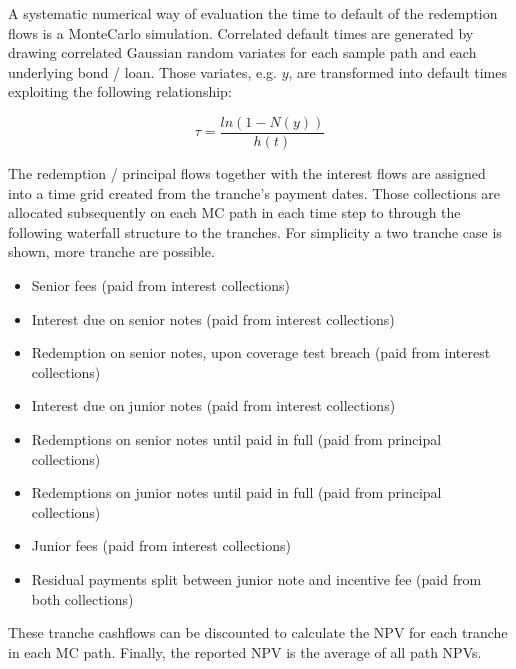 A systematic numerical way of evaluation the time to default of the redemption flows is a MonteCarlo simulation. 
Correlated default times are generated by drawing correlated Gaussian random variates for each sample path and each underlying bond / loan. 
Those variates, e.g. $y$, are transformed into default times exploiting the following relationship: 

$$
\tau = \frac{ ln \left( 1- N \left( y \right) \right) } { h \left( t \right) } 
$$

The redemption / principal flows together with the interest flows are assigned into a time grid created from the tranche’s payment dates. 
Those collections are allocated subsequently on each MC path in each time step to through the following waterfall structure to the tranches.
For simplicity a two tranche case is shown, more tranche are possible. 

\begin{itemize}
	\item Senior fees (paid from interest collections)
	\item Interest due on senior notes (paid from interest collections)
	\item Redemption on senior notes, upon coverage test breach (paid from interest collections)
	\item Interest due on junior notes (paid from interest collections)
	\item Redemptions on senior notes until paid in full (paid from principal collections)
	\item Redemptions on junior notes until paid in full (paid from principal collections)
	\item Junior fees (paid from interest collections)
	\item Residual payments split between junior note and incentive fee (paid from both collections)
\end{itemize}

These tranche cashflows can be discounted to calculate the NPV for each tranche in each MC path. 
Finally, the reported NPV is the average of all path NPVs. 
